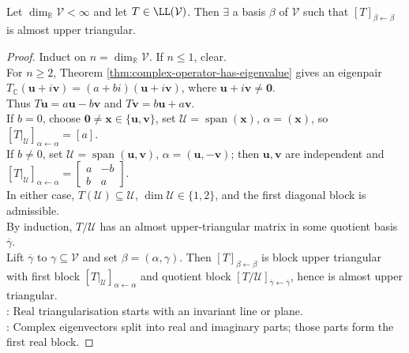 \begin{theorem} \label{thm:real-almost-upper-triangularization} \\
Let $\dim_{\mathbb{R}}\mathcal{V}<\infty$ and let $T\in\LL(\mathcal{V})$. Then $\exists$ a basis $\beta$ of $\mathcal{V}$ such that $[T]_{\beta\leftarrow\beta}$ is almost upper triangular.
\begin{proof}
Induct on $n=\dim_{\mathbb{R}}\mathcal{V}$. If $n\leq1$, clear.\\
For $n\geq2$, Theorem \ref{thm:complex-operator-has-eigenvalue} gives an eigenpair $T_{\mathbb{C}}(\mathbf{u}+i\mathbf{v})=(a+bi)(\mathbf{u}+i\mathbf{v})$, where $\mathbf{u}+i\mathbf{v}\neq\mathbf{0}$.\\
Thus $T\mathbf{u}=a\mathbf{u}-b\mathbf{v}$ and $T\mathbf{v}=b\mathbf{u}+a\mathbf{v}$.\\
If $b=0$, choose $\mathbf{0}\neq\mathbf{x}\in\{\mathbf{u},\mathbf{v}\}$, set $\mathcal{U}=\operatorname{span}(\mathbf{x})$, $\alpha=(\mathbf{x})$, so $[T|_{\mathcal{U}}]_{\alpha\leftarrow\alpha}=[a]$.\\
If $b\neq0$, set $\mathcal{U}=\operatorname{span}(\mathbf{u},\mathbf{v})$, $\alpha=(\mathbf{u},-\mathbf{v})$; then $\mathbf{u},\mathbf{v}$ are independent and $[T|_{\mathcal{U}}]_{\alpha\leftarrow\alpha}=
\begin{bmatrix}
a&-b\\
b&a
\end{bmatrix}$.\\
In either case, $T(\mathcal{U})\subseteq\mathcal{U}$, $\dim\mathcal{U}\in\{1,2\}$, and the first diagonal block is admissible.\\
By induction, $T/\mathcal{U}$ has an almost upper-triangular matrix in some quotient basis $\overline{\gamma}$.\\
Lift $\overline{\gamma}$ to $\gamma\subseteq\mathcal{V}$ and set $\beta=(\alpha,\gamma)$. Then $[T]_{\beta\leftarrow\beta}$ is block upper triangular with first block $[T|_{\mathcal{U}}]_{\alpha\leftarrow\alpha}$ and quotient block $[T/\mathcal{U}]_{\overline{\gamma}\leftarrow\overline{\gamma}}$, hence is almost upper triangular.\\
: Real triangularisation starts with an invariant line or plane.\\
: Complex eigenvectors split into real and imaginary parts; those parts form the first real block.
\end{proof}
\end{theorem}

